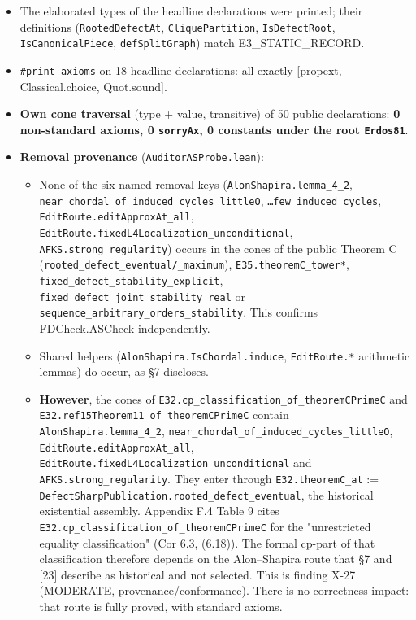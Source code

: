 \documentclass[
]{article}
\providecommand{\tightlist}{%
  \setlength{\itemsep}{0pt}\setlength{\parskip}{0pt}}
\begin{document}
\begin{itemize}
\tightlist
\item
  The elaborated types of the headline declarations were printed; their
  definitions (\texttt{RootedDefectAt}, \texttt{CliquePartition},
  \texttt{IsDefectRoot}, \texttt{IsCanonicalPiece},
  \texttt{defSplitGraph}) match E3\_STATIC\_RECORD.
\item
  \texttt{\#print\ axioms} on 18 headline declarations: all exactly
  {[}propext, Classical.choice, Quot.sound{]}.
\item
  \textbf{Own cone traversal} (type + value, transitive) of 50 public
  declarations: \textbf{0 non-standard axioms, 0 \texttt{sorryAx}, 0
  constants under the root \texttt{Erdos81}}.
\item
  \textbf{Removal provenance} (\texttt{AuditorASProbe.lean}):

  \begin{itemize}
  \tightlist
  \item
    None of the six named removal keys
    (\texttt{AlonShapira.lemma\_4\_2},
    \texttt{near\_chordal\_of\_induced\_cycles\_littleO\textquotesingle{}},
    \texttt{…few\_induced\_cycles\textquotesingle{}},
    \texttt{EditRoute.editApproxAt\_all},
    \texttt{EditRoute.fixedL4Localization\_unconditional},
    \texttt{AFKS.strong\_regularity}) occurs in the cones of the public
    Theorem C (\texttt{rooted\_defect\_eventual/\_maximum}),
    \texttt{E35.theoremC\_tower*},
    \texttt{fixed\_defect\_stability\_explicit},
    \texttt{fixed\_defect\_joint\_stability\_real} or
    \texttt{sequence\_arbitrary\_orders\_stability}. This confirms
    FDCheck.ASCheck independently.
  \item
    Shared helpers (\texttt{AlonShapira.IsChordal.induce},
    \texttt{EditRoute.*} arithmetic lemmas) do occur, as §7 discloses.
  \item
    \textbf{However}, the cones of
    \texttt{E32.cp\_classification\_of\_theoremCPrimeC} and
    \texttt{E32.ref15Theorem11\_of\_theoremCPrimeC} contain
    \texttt{AlonShapira.lemma\_4\_2},
    \texttt{near\_chordal\_of\_induced\_cycles\_littleO\textquotesingle{}},
    \texttt{EditRoute.editApproxAt\_all},
    \texttt{EditRoute.fixedL4Localization\_unconditional} and
    \texttt{AFKS.strong\_regularity}. They enter through
    \texttt{E32.theoremC\_at} :=
    \texttt{DefectSharpPublication.rooted\_defect\_eventual}, the
    historical existential assembly. Appendix F.4 Table 9 cites
    \texttt{E32.cp\_classification\_of\_theoremCPrimeC} for the
    "unrestricted equality classification" (Cor 6.3, (6.18)). The formal
    cp-part of that classification therefore depends on the
    Alon--Shapira route that §7 and {[}23{]} describe as historical and
    not selected. This is finding X-27 (MODERATE,
    provenance/conformance). There is no correctness impact: that route
    is fully proved, with standard axioms.
  \end{itemize}
\end{itemize}
\end{document}
